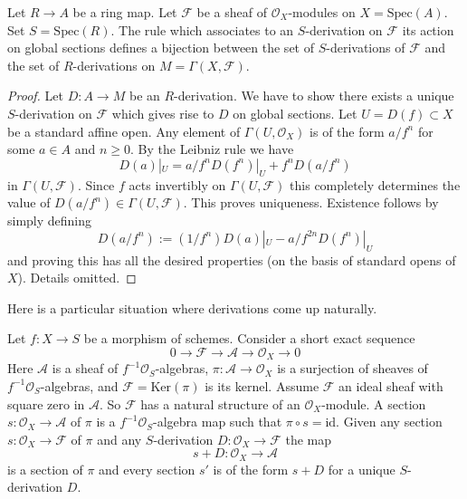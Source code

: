 \begin{lemma}
\label{lemma-affine-case-derivation}
Let $R \to A$ be a ring map. Let $\mathcal{F}$
be a sheaf of $\mathcal{O}_X$-modules
on $X = \text{Spec}(A)$. Set $S = \text{Spec}(R)$.
The rule which associates to an $S$-derivation on $\mathcal{F}$
its action on global sections defines a bijection between
the set of $S$-derivations of $\mathcal{F}$ and the set of
$R$-derivations on $M = \Gamma(X, \mathcal{F})$.
\end{lemma}

\begin{proof}
Let $D : A \to M$ be an $R$-derivation. We have to show there exists
a unique $S$-derivation on $\mathcal{F}$ which gives rise to
$D$ on global sections. Let $U = D(f) \subset X$ be a standard affine open.
Any element of $\Gamma(U, \mathcal{O}_X)$ is of the form
$a/f^n$ for some $a \in A$ and $n \geq 0$. By the Leibniz rule
we have
$$
D(a)|_U = a/f^n D(f^n)|_U + f^n D(a/f^n)
$$
in $\Gamma(U, \mathcal{F})$. Since $f$ acts invertibly
on $\Gamma(U, \mathcal{F})$ this completely determines
the value of $D(a/f^n) \in \Gamma(U, \mathcal{F})$.
This proves uniqueness. Existence follows by simply defining
$$
D(a/f^n) := (1/f^n) D(a)|_U - a/f^{2n} D(f^n)|_U
$$
and proving this has all the desired properties (on the basis
of standard opens of $X$). Details omitted.
\end{proof}

\noindent
Here is a particular situation where derivations come up
naturally.

\begin{lemma}
\label{lemma-double-structure-gives-derivation}
Let $f : X \to S$ be a morphism of schemes.
Consider a short exact sequence
$$
0 \to \mathcal{F} \to \mathcal{A} \to \mathcal{O}_X \to 0
$$
Here $\mathcal{A}$ is a sheaf of $f^{-1}\mathcal{O}_S$-algebras,
$\pi : \mathcal{A} \to \mathcal{O}_X$ is a surjection
of sheaves of $f^{-1}\mathcal{O}_S$-algebras, and
$\mathcal{F} = \text{Ker}(\pi)$ is its kernel. Assume $\mathcal{F}$ an ideal
sheaf with square zero in $\mathcal{A}$. So $\mathcal{F}$
has a natural structure of an $\mathcal{O}_X$-module.
A section $s : \mathcal{O}_X \to \mathcal{A}$ of $\pi$
is a $f^{-1}\mathcal{O}_S$-algebra map such that $\pi \circ s = \text{id}$.
Given any section $s : \mathcal{O}_X \to \mathcal{F}$
of $\pi$ and any $S$-derivation $D : \mathcal{O}_X \to \mathcal{F}$
the map
$$
s + D : \mathcal{O}_X \to \mathcal{A}
$$
is a section of $\pi$ and every section $s'$ is of the form $s + D$
for a unique $S$-derivation $D$.
\end{lemma}

